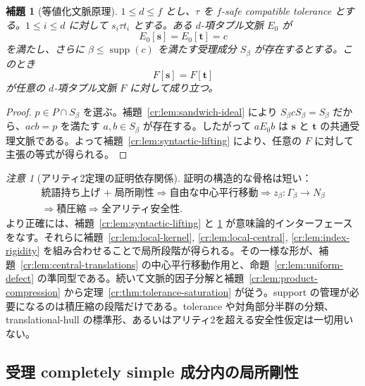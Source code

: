 \documentclass[10pt,a4paper]{ltjsarticle}
\newtheorem{lemma}[theorem]{補題}
\theoremstyle{definition}
\theoremstyle{remark}
\newtheorem{remark}[theorem]{注意}
\begin{document}
\begin{lemma}[等値化文脈原理]
\label{cr:lem:equalizing-context}
$1\le d\le f$ とし、$\tau$ を $f$-safe compatible tolerance とする。$1\le i\le d$ に対して $s_i\tau t_i$ とする。ある $d$-項タプル文脈 $E_0$ が
\[
E_0[\mathbf s]=E_0[\mathbf t]=c
\]
を満たし、さらに
\(\beta\le\operatorname{supp}(c)\)
を満たす受理成分 $S_\beta$ が存在するとする。このとき
\[
F[\mathbf s]=F[\mathbf t]
\]
が任意の $d$-項タプル文脈 $F$ に対して成り立つ。
\end{lemma}

\begin{proof}
$p\in P\cap S_\beta$ を選ぶ。補題~\ref{cr:lem:sandwich-ideal} により $S_\beta cS_\beta=S_\beta$ だから、$acb=p$ を満たす $a,b\in S_\beta$ が存在する。したがって $aE_0b$ は $\mathbf s$ と $\mathbf t$ の共通受理文脈である。よって補題~\ref{cr:lem:syntactic-lifting} により、任意の $F$ に対して主張の等式が得られる。
\end{proof}

\begin{remark}[アリティ2定理の証明依存関係]
\label{cr:rem:dependencies}
証明の構造的な骨格は短い：
\[
\begin{gathered}
\text{統語持ち上げ + 局所剛性}
\Longrightarrow
\text{自由な中心平行移動}
\Longrightarrow
z_\beta:\Gamma_\beta\to N_\beta
\\[-1pt]
\Longrightarrow
\text{積圧縮}
\Longrightarrow
\text{全アリティ安全性}.
\end{gathered}
\]
より正確には、補題~\ref{cr:lem:syntactic-lifting} と
\ref{cr:lem:equalizing-context} が意味論的インターフェースをなす。それらに補題~\ref{cr:lem:local-kernel}, \ref{cr:lem:local-central}, \ref{cr:lem:index-rigidity} を組み合わせることで局所段階が得られる。その一様な形が、補題~\ref{cr:lem:central-translations} の中心平行移動作用と、命題~\ref{cr:lem:uniform-defect} の準同型である。続いて文脈的因子分解と補題~\ref{cr:lem:product-compression} から定理~\ref{cr:thm:tolerance-saturation} が従う。support の管理が必要になるのは積圧縮の段階だけである。tolerance や対角部分半群の分類、translational-hull の標準形、あるいはアリティ2を超える安全性仮定は一切用いない。
\end{remark}

\subsection{受理 completely simple 成分内の局所剛性}
\end{document}
